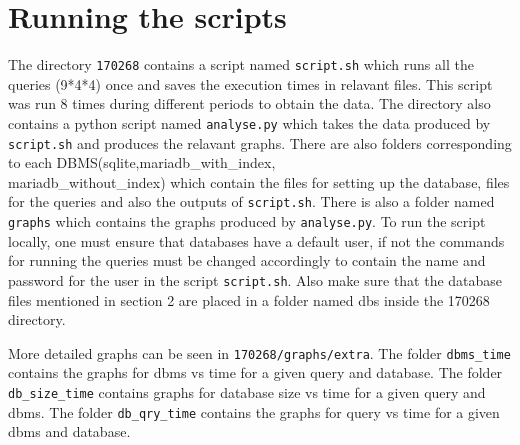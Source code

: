 \documentclass[12pt]{article}
\begin{document}
\section{Running the scripts}
The directory \texttt{170268} contains a script named \texttt{script.sh} which runs all the queries (9*4*4) once and saves the execution times in 
relavant files. This script was run 8 times during different periods to obtain the data. The directory also contains a python script named \texttt{analyse.py} which
takes the data produced by \texttt{script.sh} and produces the relavant graphs. There are also folders corresponding to each DBMS(sqlite,mariadb\_with\_index,\\
mariadb\_without\_index) which contain the files for setting up the database, files for the queries and also the outputs of \texttt{script.sh}. There is also a folder named \texttt{graphs} which contains the graphs produced by \texttt{analyse.py}.
To run the script locally, one must ensure that databases have a default user, if not the commands for running the queries must be changed accordingly to contain the name and password for the user in the script \texttt{script.sh}. Also make sure that the database files mentioned in section 2 are placed in a folder named dbs inside the 170268 directory.

More detailed graphs can be seen in \texttt{170268/graphs/extra}. The folder \texttt{dbms\_time} contains the graphs for dbms vs time for a given query and database. The folder \texttt{db\_size\_time} contains graphs for database size vs time for a given query and dbms. The folder \texttt{db\_qry\_time} contains the graphs for query vs time for a given dbms and database.
\end{document}
